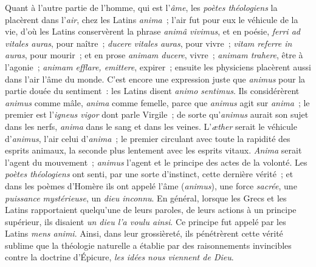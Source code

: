 \documentclass[french,twoside]{book} %
\begin{document}
Quant à l’autre partie de l’homme, qui est l’{\itshape âme}, les {\itshape poètes théologiens} la placèrent dans l’{\itshape air}, chez les Latins {\itshape anima} ; l’air fut pour eux le véhicule de la vie, d’où les Latins conservèrent la phrase {\itshape animâ vivimus}, et en poésie, {\itshape ferri ad vitales auras}, pour naître ; {\itshape ducere vitales auras}, pour vivre ; {\itshape vitam referre in auras}, pour mourir ; et en prose {\itshape animam ducere}, vivre ; {\itshape animam trahere}, être à l’agonie ; {\itshape animam efflare, emittere}, expirer ; ensuite les physiciens placèrent aussi dans l’air l’âme du monde. C’est encore une expression juste que {\itshape animus} pour la partie douée du sentiment : les Latins disent {\itshape animo sentimus}. Ils considérèrent {\itshape animus} comme mâle, {\itshape anima} comme femelle, parce que {\itshape animus} agit sur {\itshape anima} ; le premier est l’\emph{{\itshape igneus vigor}} dont parle Virgile ; de sorte qu’{\itshape animus} aurait son sujet dans les nerfs, {\itshape anima} dans le sang et dans les veines. L’{\itshape æther} serait le véhicule d’{\itshape animus}, l’air celui d’{\itshape anima} ; le premier circulant avec toute la rapidité des esprits animaux, la seconde plus lentement avec les esprits vitaux. {\itshape Anima} serait l’agent du mouvement ; {\itshape animus} l’agent et le principe des actes de la volonté. Les {\itshape poètes théologiens} ont senti, par une sorte d’instinct, cette dernière vérité ; et dans les poèmes d’Homère ils ont appelé l’âme ({\itshape animus}), une force {\itshape sacrée}, une {\itshape puissance mystérieuse}, un {\itshape dieu inconnu}. En général, lorsque les Grecs et les Latins rapportaient  quelqu’une de leurs paroles, de leurs actions à un principe supérieur, ils disaient {\itshape un dieu l’a voulu ainsi}. Ce principe fut appelé par les Latins {\itshape mens animi}. Ainsi, dans leur grossièreté, ils pénétrèrent cette vérité sublime que la théologie naturelle a établie par des raisonnements invincibles contre la doctrine d’Épicure, {\itshape les idées nous viennent de Dieu}.\par
\end{document}
